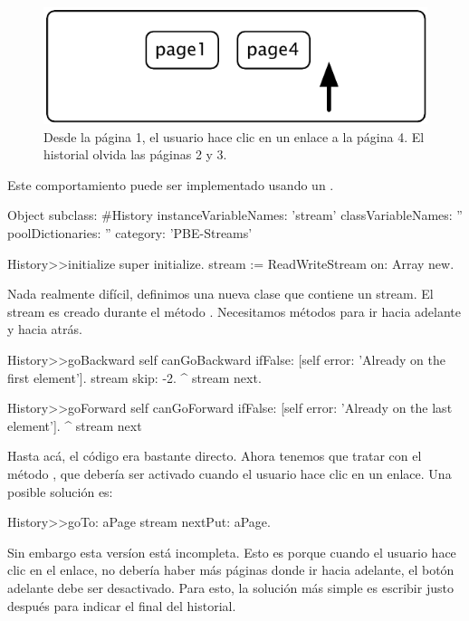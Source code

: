 \documentclass[a4paper,10pt,twoside]{book}
\begin{document}
{\begin{figure}[!ht]
\centerline{\includegraphics[scale=0.5]{page4Stef}}
\caption{Desde la p\'agina 1, el usuario hace clic en un enlace a la p\'agina 4. El historial olvida las p\'aginas 2 y 3.}
\vspace{.2in}
\end{figure}

\noindent Este comportamiento puede ser implementado usando un .


\begin{code}{}
Object subclass: #History
  instanceVariableNames: 'stream'
  classVariableNames: ''
  poolDictionaries: ''
  category: 'PBE-Streams'

History>>initialize
    super initialize.
    stream := ReadWriteStream on: Array new.
\end{code}

Nada realmente dif\'icil, definimos una nueva clase que contiene un stream. El stream es creado durante el m\'etodo .
Necesitamos m\'etodos para ir hacia adelante y hacia atr\'as.

\begin{code}{}
History>>goBackward
  self canGoBackward ifFalse: [self error: 'Already on the first element'].
  stream skip: -2.
  ^ stream next.

History>>goForward
  self canGoForward ifFalse: [self error: 'Already on the last element'].
  ^ stream next
\end{code}

Hasta ac\'a, el c\'odigo era bastante directo. Ahora tenemos que tratar con el m\'etodo , que deber\'ia 
ser activado cuando el usuario hace clic en un enlace. Una posible soluci\'on es:

\begin{code}{}
History>>goTo: aPage
    stream nextPut: aPage.
\end{code}

Sin embargo esta vers\'ion est\'a incompleta. Esto es porque cuando el usuario
hace clic en el enlace, no deber\'ia haber m\'as p\'aginas donde ir hacia adelante, 
\ie el bot\'on adelante debe ser desactivado. Para esto, la soluci\'on m\'as simple
es escribir  justo despu\'es para indicar el final del historial.

}
\end{document}
